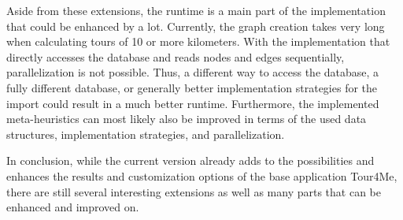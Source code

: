 Aside from these extensions, the runtime is a main part of the implementation that could be enhanced by a lot. 
Currently, the graph creation takes very long when calculating tours of 10 or more kilometers.
With the implementation that directly accesses the database and reads nodes and edges sequentially, parallelization is not possible.
Thus, a different way to access the database, a fully different database, or generally better implementation strategies for the import could result in a much better runtime.
Furthermore, the implemented meta-heuristics can most likely also be improved in terms of the used data structures, implementation strategies, and parallelization.

In conclusion, while the current version already adds to the possibilities and enhances the results and customization options of the base application Tour4Me, there are still several interesting extensions as well as many parts that can be enhanced and improved on.



